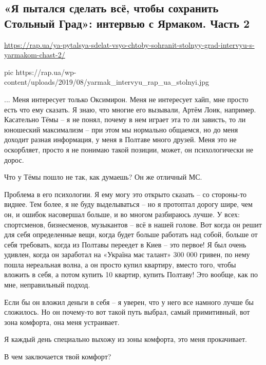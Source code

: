  
 

\subsection{«Я пытался сделать всё, чтобы сохранить Стольный Град»: интервью с Ярмаком. Часть 2}

\url{https://rap.ua/ya-pytalsya-sdelat-vsyo-chtoby-sohranit-stolnyy-grad-intervyu-s-yarmakom-chast-2/}

\ifcmt
pic https://rap.ua/wp-content/uploads/2019/08/yarmak_intervyu_rap_ua_stolnyi.jpg
\fi

... Меня интересует только Оксимирон. Меня не интересует хайп, мне просто есть
что ему сказать. Я знаю, что многие его вызывали, Артём Лоик, например.
Касательно Тёмы – я не понял, почему в нем играет эта то ли зависть, то ли
юношеский максимализм – при этом мы нормально общаемся, но до меня доходит
разная информация, у меня в Полтаве много друзей. Меня это не оскорбляет,
просто я не понимаю такой позиции, может, он психологически не дорос.

Что у Тёмы пошло не так, как думаешь? Он же отличный МС.

Проблема в его психологии. Я ему могу это открыто сказать – со стороны-то
виднее. Тем более, я не буду выделываться – но я протоптал дорогу шире, чем он,
и ошибок насовершал больше, и во многом разбираюсь лучше. У всех: спортсменов,
бизнесменов, музыкантов – всё в нашей голове. Вот когда он решит для себя
определенные вещи, когда будет больше работать над собой, больше от себя
требовать, когда из Полтавы переедет в Киев – это первое! Я был очень удивлен,
когда он заработал на «Україна має талант» 300 000 гривен, по нему пошла
нереальная волна, а он просто купил квартиру, вместо того, чтобы вложить в
себя, а потом купить 10 квартир, купить Полтаву! Это вообще, как по мне,
неправильный подход.

Если бы он вложил деньги в себя – я уверен, что у него все намного лучше бы
сложилось. Но он почему-то вот такой путь выбрал, самый примитивный, вот зона
комфорта, она меня устраивает.

Я каждый день специально выхожу из зоны комфорта, это меня прокачивает.

В чем заключается твой комфорт?

